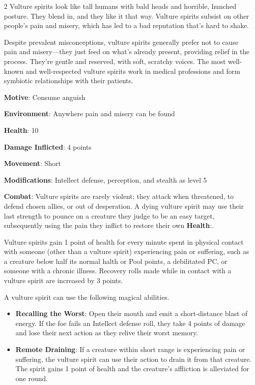 \begin{multicols}{2}
Vulture spirits look like tall humans with bald heads and horrible, hunched posture. They blend in, and they like it that way. Vulture spirits subsist on other people’s pain and misery, which has led to a bad reputation that’s hard to shake. 

Despite prevalent misconceptions, vulture spirits generally prefer not to cause pain and misery—they just feed on what’s already present, providing relief in the process. They’re gentle and reserved, with soft, scratchy voices. The most well-known and well-respected vulture spirits work in medical professions and form symbiotic relationships with their patients.

\textbf{Motive}: Consume anguish 

\textbf{Environment}: Anywhere pain and misery can be found 

\textbf{Health}: 10 

\textbf{Damage Inflicted}: 4 points 

\textbf{Movement}: Short 

\textbf{Modifications}: Intellect defense, perception, and stealth as level 5 

\textbf{Combat}: Vulture spirits are rarely violent; they attack when threatened, to defend chosen allies, or out of desperation. A dying vulture spirit may use their last strength to pounce on a creature they judge to be an easy target, subsequently using the pain they inflict to restore their own \textbf{Health}:. 

Vulture spirits gain 1 point of health for every minute spent in physical contact with someone (other than a vulture spirit) experiencing pain or suffering, such as a creature below half its normal halth or Pool points, a debilitated PC, or someone with a chronic illness. Recovery rolls made while in contact with a vulture spirit are increased by 3 points. 

A vulture spirit can use the following magical abilities. 

\begin{itemize}
\item \textbf{Recalling the Worst}: Open their mouth and emit a short-distance blast of energy. If the foe fails an Intellect defense roll, they take 4 points of damage and lose their next action as they relive their worst memory. 

\item \textbf{Remote Draining}: If a creature within short range is experiencing pain or suffering, the vulture spirit can use their action to drain it from that creature. The spirit gains 1 point of health and the creature’s affliction is alleviated for one round. 
\end{itemize}


\end{multicols}
